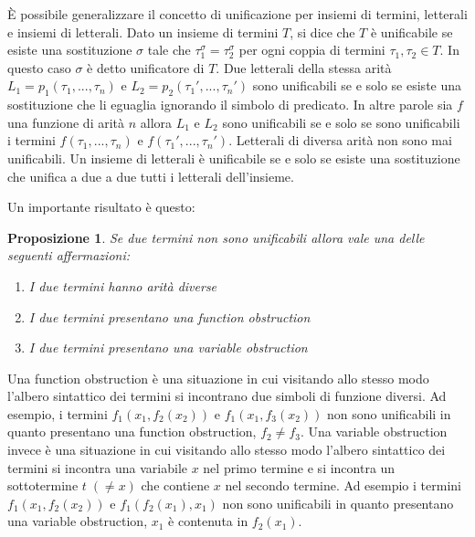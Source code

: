 \documentclass[./main.tex]{subfiles}
\begin{document}
È possibile generalizzare il concetto di unificazione per insiemi di termini, letterali e insiemi di letterali.
Dato un insieme di termini $T$, si dice che $T$ è unificabile se esiste una sostituzione $\sigma$ tale che $\tau_1^\sigma = \tau_2^\sigma$
per ogni coppia di termini $\tau_1, \tau_2 \in T$. In questo caso $\sigma$ è detto unificatore di $T$. 
Due letterali della stessa arità $L_1 = p_1(\tau_1, ..., \tau_n)$ e $L_2 = p_2(\tau_1', ..., \tau_n')$ 
sono unificabili se e solo se esiste una sostituzione che li eguaglia ignorando il simbolo di predicato.
In altre parole sia $f$ una funzione di arità $n$ allora $L_1$ e $L_2$ sono unificabili se e solo se sono unificabili i termini
$f(\tau_1, ..., \tau_n)$ e $f(\tau_1', ..., \tau_n')$.
Letterali di diversa arità non sono mai unificabili.
Un insieme di letterali è unificabile se e solo se esiste una sostituzione che unifica a due a due tutti i letterali dell'insieme.


Un importante risultato è questo:
\newtheorem{proposition}{Proposizione}
\begin{proposition}
  Se due termini non sono unificabili allora vale una delle seguenti affermazioni:
  \begin{enumerate}
    \item I due termini hanno arità diverse
    \item I due termini presentano una function obstruction 
    \item I due termini presentano una variable obstruction
  \end{enumerate}
\end{proposition}

Una function obstruction è una situazione in cui visitando allo stesso modo l'albero sintattico dei termini si incontrano
due simboli di funzione diversi. Ad esempio, i termini $f_1(x_1, f_2(x_2))$ e $f_1(x_1, f_3(x_2))$ non sono unificabili in quanto
presentano una function obstruction, $f_2 \neq f_3$. Una variable obstruction invece è una situazione in cui visitando allo stesso modo
l'albero sintattico dei termini si incontra una variabile $x$ nel primo termine 
e si incontra un sottotermine $t \; (\neq x)$ che contiene $x$ nel secondo termine. Ad esempio i termini $f_1(x_1, f_2(x_2))$ e $f_1(f_2(x_1), x_1)$
non sono unificabili in quanto presentano una variable obstruction, $x_1$ è contenuta in $f_2(x_1)$.
\end{document}
